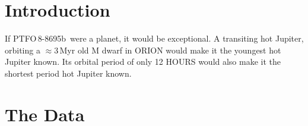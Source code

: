 \documentclass[12pt,twocolumn,tighten]{aastex62}
\newcommand{\ptfob}{PTFO$\,$8-8695b}
\begin{document}
\keywords{}


\section{Introduction}
If \ptfob\ were a planet, it would be exceptional.
A transiting hot Jupiter, orbiting a $\approx$3$\,$Myr old M dwarf
in ORION would make it the youngest hot Jupiter known.
Its orbital period of only 12 HOURS would also make it the shortest
period hot Jupiter known.


\section{The Data}
\label{sec:observations}
\end{document}
